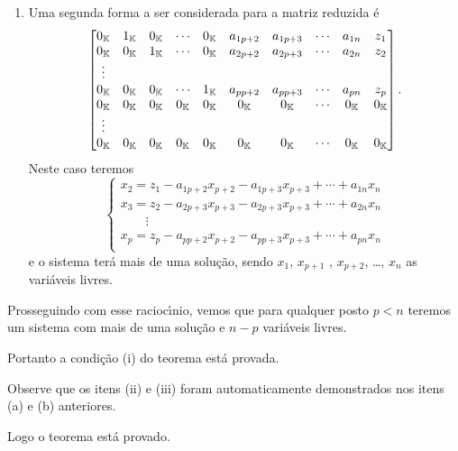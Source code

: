 \begin{prova}
\begin{enumerate}
\begin{enumerate}
\[\begin{cases}
				x_2 = z_2 - a_{2 p + 1}x_{p + 1} - a_{2 p + 2}x_{p + 2} + \cdots + a_{2n}x_{n}\\
				\qquad \vdots\\
				x_p = z_p - a_{p p + 1}x_{p + 1} - a_{p p + 2}x_{p + 2} + \cdots + a_{pn}x_{n}\\
			\end{cases}
		\]
		e o sistema ter\'a mais de uma solu\c{c}\~ao, sendo $x_{p + 1}$ , $x_{p + 2}$, \dots, $x_n$ as vari\'aveis livres.
		\item Uma segunda forma a ser considerada para a matriz reduzida \'e
		\[
			\begin{bmatrix}
				0_{\mathbb{K}} & 1_{\mathbb{K}} & 0_{\mathbb{K}} & \cdots & 0_{\mathbb{K}} & a_{1p+2} & a_{1p+3} & \cdots & a_{1n} & z_1\\
				0_{\mathbb{K}} & 0_{\mathbb{K}} & 1_{\mathbb{K}} & \cdots & 0_{\mathbb{K}} & a_{2p+2} & a_{2p+3} & \cdots & a_{2n} & z_2\\
				\vdots\\
				0_{\mathbb{K}} & 0_{\mathbb{K}} & 0_{\mathbb{K}} & \cdots & 1_{\mathbb{K}} & a_{pp+2} & a_{pp+3} & \cdots & a_{pn} & z_p\\
				0_{\mathbb{K}} & 0_{\mathbb{K}} & 0_{\mathbb{K}} & 0_{\mathbb{K}} & 0_{\mathbb{K}} & 0_{\mathbb{K}} & 0_{\mathbb{K}} & \cdots & 0_{\mathbb{K}} & 0_{\mathbb{K}}\\
				\vdots\\
				0_{\mathbb{K}} & 0_{\mathbb{K}} & 0_{\mathbb{K}} & 0_{\mathbb{K}} & 0_{\mathbb{K}} & 0_{\mathbb{K}} & 0_{\mathbb{K}} & \cdots & 0_{\mathbb{K}}  & 0_{\mathbb{K}}
			\end{bmatrix}.
		\]
		Neste caso teremos
		\[
			\begin{cases}
				x_2 = z_1 - a_{1 p + 2}x_{p + 2} - a_{1 p + 3}x_{p + 3} + \cdots + a_{1n}x_{n}\\
				x_3 = z_2 - a_{2 p + 3}x_{p + 3} - a_{2 p + 3}x_{p + 3} + \cdots + a_{2n}x_{n}\\
				\qquad \vdots\\
				x_p = z_p - a_{p p + 2}x_{p + 2} - a_{p p + 3}x_{p + 3} + \cdots + a_{pn}x_{n}\\
			\end{cases}
		\]
		e o sistema ter\'a mais de uma solu\c{c}\~ao, sendo $x_1$, $x_{p + 1}$ , $x_{p + 2}$, \dots, $x_n$ as vari\'aveis livres.
		\end{enumerate}
		Prosseguindo com esse racioc{\'\i}nio, vemos que para qualquer posto $p < n$ teremos um sistema com mais de uma solu\c{c}\~ao e $n - p$ vari\'aveis livres.
	\end{enumerate}
	Portanto a condi\c{c}\~ao (i) do teorema est\'a provada.

	Observe que os itens (ii) e (iii) foram automaticamente demonstrados nos itens (a) e (b) anteriores.

	Logo o teorema est\'a provado.
\end{prova}

